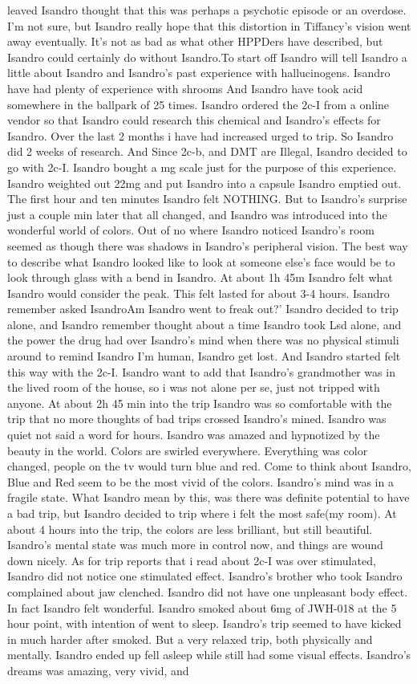\documentclass[12pt]{book}
\begin{document}
leaved Isandro thought that this was perhaps a psychotic episode or an overdose. I'm not sure, but Isandro really hope that this distortion in Tiffancy's vision went away eventually. It's not as bad as what other HPPDers have described, but Isandro could certainly do without Isandro.To start off Isandro will tell Isandro a little about Isandro and Isandro's past experience with hallucinogens. Isandro have had plenty of experience with shrooms And Isandro have took acid somewhere in the ballpark of 25 times. Isandro ordered the 2c-I from a online vendor so that Isandro could research this chemical and Isandro's effects for Isandro. Over the last 2 months i have had increased urged to trip. So Isandro did 2 weeks of research. And Since 2c-b, and DMT are Illegal, Isandro decided to go with 2c-I. Isandro bought a mg scale just for the purpose of this experience. Isandro weighted out 22mg and put Isandro into a capsule Isandro emptied out. The first hour and ten minutes Isandro felt NOTHING. But to Isandro's surprise just a couple min later that all changed, and Isandro was introduced into the wonderful world of colors. Out of no where Isandro noticed Isandro's room seemed as though there was shadows in Isandro's peripheral vision. The best way to describe what Isandro looked like to look at someone else's face would be to look through glass with a bend in Isandro. At about 1h 45m Isandro felt what Isandro would consider the peak. This felt lasted for about 3-4 hours. Isandro remember asked IsandroAm Isandro went to freak out?' Isandro decided to trip alone, and Isandro remember thought about a time Isandro took Lsd alone, and the power the drug had over Isandro's mind when there was no physical stimuli around to remind Isandro I'm human, Isandro get lost. And Isandro started felt this way with the 2c-I. Isandro want to add that Isandro's grandmother was in the lived room of the house, so i was not alone per se, just not tripped with anyone. At about 2h 45 min into the trip Isandro was so comfortable with the trip that no more thoughts of bad trips crossed Isandro's mined. Isandro was quiet not said a word for hours. Isandro was amazed and hypnotized by the beauty in the world. Colors are swirled everywhere. Everything was color changed, people on the tv would turn blue and red. Come to think about Isandro, Blue and Red seem to be the most vivid of the colors. Isandro's mind was in a fragile state. What Isandro mean by this, was there was definite potential to have a bad trip, but Isandro decided to trip where i felt the most safe(my room). At about 4 hours into the trip, the colors are less brilliant, but still beautiful. Isandro's mental state was much more in control now, and things are wound down nicely. As for trip reports that i read about 2c-I was over stimulated, Isandro did not notice one stimulated effect. Isandro's brother who took Isandro complained about jaw clenched. Isandro did not have one unpleasant body effect. In fact Isandro felt wonderful. Isandro smoked about 6mg of JWH-018 at the 5 hour point, with intention of went to sleep. Isandro's trip seemed to have kicked in much harder after smoked. But a very relaxed trip, both physically and mentally. Isandro ended up fell asleep while still had some visual effects. Isandro's dreams was amazing, very vivid, and 
\end{document}

